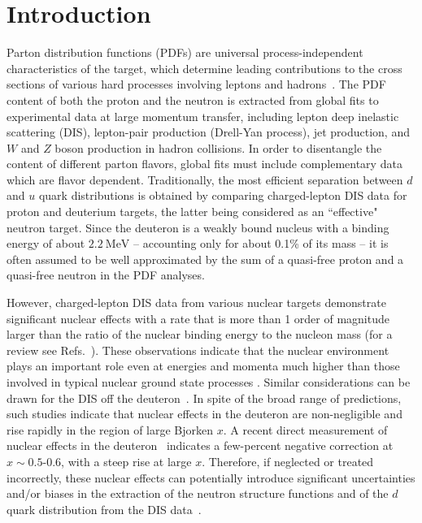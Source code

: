\documentclass[%
      aps,
      prd,
      floatfix,
      preprintnumbers,
      preprint,
      showpacs,
      nofootinbib,
      tightenlines,
      amssymb,
      amsmath
]{revtex4-1}
\newcommand{\mev}    {\:\mathrm{MeV}}
\begin{document}
\section{Introduction}
\label{sec:intro}

Parton distribution functions (PDFs) are universal process-independent characteristics
of the target, which determine leading contributions to the cross sections of various hard 
processes involving leptons and hadrons~\cite{Collins:1989gx}. The PDF content of  
both the proton and the neutron is extracted from global fits 
\cite{Alekhin:2017kpj,Harland-Lang:2014zoa,Ball:2014uwa,Dulat:2015mca} 
to experimental data at large momentum transfer, including lepton deep inelastic scattering (DIS), 
lepton-pair production (Drell-Yan process), jet production, and  
$W$ and $Z$ boson production in hadron collisions.  
%
In order to disentangle the content of different parton flavors, global fits must include 
complementary data which are flavor dependent. 
Traditionally, the most efficient separation between $d$ and $u$ quark
distributions is obtained by comparing charged-lepton DIS data for proton and deuterium targets, 
the latter being considered as an ``effective" neutron target. 
Since the deuteron is a weakly bound nucleus with a binding energy of about $2.2\mev$ --
accounting only for about 0.1\% of its mass -- it is often assumed to be well approximated by the sum 
of a quasi-free proton and a quasi-free neutron in the PDF analyses.

However, charged-lepton DIS data from various nuclear targets demonstrate significant nuclear effects
with a rate that is more than 1 order of magnitude larger than the ratio of the nuclear
binding energy to the nucleon mass (for a review see Refs.~\cite{Arneodo:1992wf,Norton:2003cb}).
These observations indicate that the nuclear environment plays an important role 
even at energies and momenta much higher
than those involved in typical nuclear ground state processes
\cite{Arneodo:1992wf,Norton:2003cb,Geesaman:1995yd}.
%  
Similar considerations can be drawn for the DIS off the deuteron~\cite{Atwood:1972zp,Landshoff:1977pg,  
Kusno:1979dk, Bodek:1980ar, Dunne:1985cn, Frankfurt:1988nt, Kaptar:1991hx, Nakano:1991kh,
Epele:1992np, Braun:1993nh, Gomez:1993ri, Melnitchouk:1994rv, Abe:1994rj, Burov:1998kz, Alekhin:2003qq,
Burov:2003yq, KP04, Kulagin:2007ph, Arrington:2008zh, Weinstein:2010rt, Arrington:2011qt}.
In spite of the broad range of predictions, such studies indicate that nuclear effects in the deuteron 
are non-negligible and rise rapidly in the region of large Bjorken $x$. 
A recent direct measurement of nuclear effects in the deuteron~\cite{Griffioen:2015hxa}
indicates a few-percent negative correction at $x\sim 0.5$-$0.6$, with a steep rise at large $x$. 
Therefore, if neglected or treated incorrectly, these nuclear effects can potentially 
introduce significant uncertainties and/or biases in the extraction of the neutron structure functions and 
of the $d$ quark distribution from the DIS data~\cite{Accardi:2011fa}.
\end{document}
